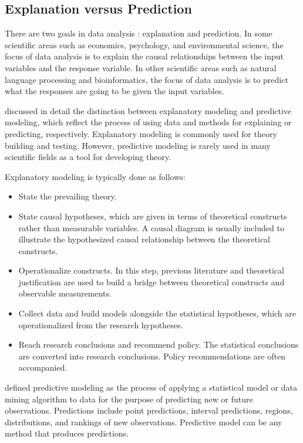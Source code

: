 \documentclass[12pt]{article}
\begin{document}
\subsection{Explanation versus Prediction}\label{sec:expred}

There are two goals in data analysis \citep{breiman2001modeling,shmueli2010model}: explanation and prediction. In some scientific areas such as economics, psychology, and environmental science, the focus of data analysis is to explain the causal relationships between the input variables and the response variable. In other scientific areas such as natural language processing and bioinformatics, the focus of data analysis is to predict what the responses are going to be given the input variables.

\cite{shmueli2010model} discussed in detail the distinction between explanatory modeling and predictive modeling, which reflect the process of using data and methods for explaining or predicting, respectively. Explanatory modeling is commonly used for theory building and testing. However, predictive modeling is rarely used in many scientific fields as a tool for developing theory.  

Explanatory modeling is typically done as follows:
\begin{itemize}
\item State the prevailing theory.
\item State causal hypotheses, which are given in terms of theoretical constructs rather than measurable variables. A causal diagram is usually included to illustrate the hypothesized causal relationship between the theoretical constructs.
\item Operationalize constructs. In this step, previous literature and theoretical justification are used to build a bridge between theoretical constructs and observable measurements.
\item Collect data and build models alongside the statistical hypotheses, which are operationalized from the research hypotheses. 
\item Reach research conclusions and recommend policy. The statistical conclusions are converted into research conclusions. Policy recommendations are often accompanied.
\end{itemize}

\cite{shmueli2010model} defined predictive modeling as the process of applying a statistical model or data mining algorithm to data for the purpose of predicting new or future observations. Predictions include point predictions, interval predictions, regions, distributions, and rankings of new observations. Predictive model can be any method that produces predictions. 
\end{document}
